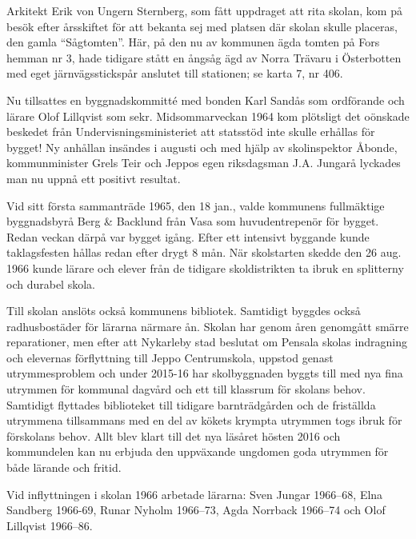 Arkitekt Erik von Ungern Sternberg, som fått uppdraget att rita skolan, kom på besök efter årsskiftet för att bekanta sej med platsen där skolan skulle placeras, den gamla ``Sågtomten''. Här, på den nu av kommunen ägda tomten på Fors hemman nr 3, hade tidigare stått en ångsåg ägd av Norra Trävaru i Österbotten med eget järnvägsstickspår anslutet till stationen; se karta 7, nr 406.

Nu tillsattes en byggnadskommitté med bonden Karl Sandås som ordförande och lärare Olof Lillqvist som sekr. Midsommarveckan 1964 kom plötsligt det oönskade beskedet från Undervisningsministeriet att statsstöd inte skulle erhållas för bygget! Ny anhållan insändes i augusti och med hjälp av skolinspektor Åbonde, kommunminister Grels Teir och Jeppos egen riksdagsman J.A. Jungarå lyckades man nu uppnå ett positivt resultat.

Vid sitt första sammanträde 1965,  den 18 jan., valde kommunens fullmäktige byggnadsbyrå Berg \& Backlund från Vasa som huvudentrepenör för bygget. Redan veckan därpå var bygget igång. Efter ett intensivt byggande kunde taklagsfesten hållas redan efter drygt 8 mån. När skolstarten skedde den 26 aug. 1966 kunde lärare och elever från de tidigare skoldistrikten ta ibruk en splitterny och durabel skola.

Till skolan anslöts också kommunens bibliotek. Samtidigt byggdes också radhusbostäder för lärarna närmare ån. Skolan har genom åren genomgått smärre reparationer, men efter att Nykarleby stad beslutat om Pensala skolas indragning och elevernas förflyttning till Jeppo Centrumskola, uppstod genast utrymmesproblem och under 2015-16 har skolbyggnaden byggts till med nya fina utrymmen för kommunal dagvård och ett till klassrum för skolans behov. Samtidigt flyttades biblioteket till tidigare barnträdgården och de friställda utrymmena tillsammans med en del av kökets krympta  utrymmen togs ibruk för förskolans behov. Allt blev klart till det nya läsåret hösten 2016 och kommundelen kan nu erbjuda den uppväxande ungdomen goda utrymmen för både lärande och fritid.

Vid inflyttningen i skolan 1966 arbetade lärarna: Sven Jungar 1966--68, Elna Sandberg 1966-69, Runar Nyholm 1966--73, Agda Norrback 1966--74 och Olof Lillqvist 1966--86.

